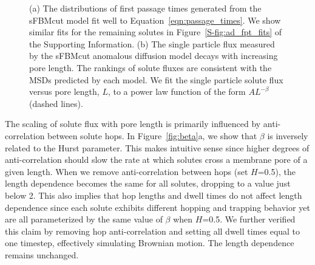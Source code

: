 \documentclass[journal=jctcce,manuscript=article]{achemso}
\begin{document}
\begin{figure}
\begin{subfigure}{0.485\textwidth}
  \caption{}\label{fig:flux_curves_ad}
  \end{subfigure}
  \caption{(a) The distributions of first passage times generated from the
	  sFBMcut model fit well to Equation~\ref{eqn:passage_times}. We show
	  similar fits for the remaining solutes in
	  Figure~\ref{S-fig:ad_fpt_fits} of the Supporting Information. (b) The
	  single particle flux measured by the sFBMcut anomalous diffusion model
	  decays with increasing pore length. The rankings of solute fluxes are consistent
	  with the MSDs predicted by each model. We fit the single particle
	  solute flux versus pore length, $L$, to a power law function of the
	  form $AL^{-\beta}$ (dashed lines). 
  }\label{fig:flux_curves}
  \end{figure}

  The scaling of solute flux with pore length is primarily influenced by
  anti-correlation between solute hops. In Figure~\ref{fig:beta}a, we show that
  $\beta$ is inversely related to the Hurst parameter. This makes intuitive
  sense since higher degrees of anti-correlation should slow the rate at which
  solutes cross a membrane pore of a given length. When we remove anti-correlation between
  hops (set $H$=0.5), the length dependence becomes the same for all solutes,
  dropping to a value just below 2. This also implies that hop lengths and
  dwell times do not affect length dependence since each solute exhibits
  different hopping and trapping behavior yet are all parameterized by the same
  value of $\beta$ when $H$=0.5. We further verified this claim by removing
  hop anti-correlation and setting all dwell times equal to one timestep,
  effectively simulating Brownian motion.  The length dependence remains
  unchanged. 
\end{document}
